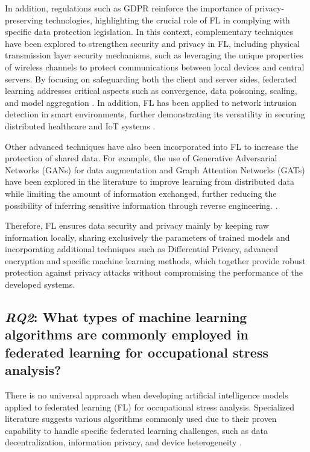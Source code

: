 \documentclass[12pt]{article}
\begin{document}
In addition, regulations such as GDPR reinforce the importance of privacy-preserving technologies, highlighting the crucial role of FL in complying with specific data protection legislation. In this context, complementary techniques have been explored to strengthen security and privacy in FL, including physical transmission layer security mechanisms, such as leveraging the unique properties of wireless channels to protect communications between local devices and central servers. By focusing on safeguarding both the client and server sides, federated learning addresses critical aspects such as convergence, data poisoning, scaling, and model aggregation \cite{chuan_ma_e07241ba}. In addition, FL has been applied to network intrusion detection in smart environments, further demonstrating its versatility in securing distributed healthcare and IoT systems \cite{cholakoska2023federated}.

Other advanced techniques have also been incorporated into FL to increase the protection of shared data. For example, the use of Generative Adversarial Networks (GANs) for data augmentation and Graph Attention Networks (GATs) have been explored in the literature to improve learning from distributed data while limiting the amount of information exchanged, further reducing the possibility of inferring sensitive information through reverse engineering. \cite{shiyi_jiang_49d728e9}.

Therefore, FL ensures data security and privacy mainly by keeping raw information locally, sharing exclusively the parameters of trained models and incorporating additional techniques such as Differential Privacy, advanced encryption and specific machine learning methods, which together provide robust protection against privacy attacks without compromising the performance of the developed systems.
    
\subsection{\textit{RQ2}: What types of machine learning algorithms are commonly employed in federated learning for occupational stress analysis?}

There is no universal approach when developing artificial intelligence models applied to federated learning (FL) for occupational stress analysis. Specialized literature suggests various algorithms commonly used due to their proven capability to handle specific federated learning challenges, such as data decentralization, information privacy, and device heterogeneity \cite{adam_sadilek_c59c73f4}.
\end{document}

